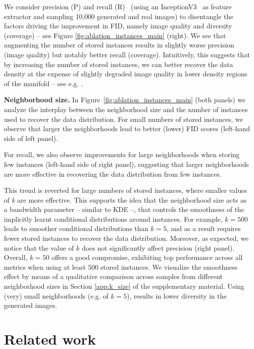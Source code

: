 We consider precision (P) and recall (R)~\cite{kynkaanniemi2019improved} (using an InceptionV3~\cite{DBLP:journals/corr/SzegedyVISW15} as feature extractor and sampling 10,000 generated and real images) to disentangle the factors driving the improvement in FID, namely image quality and diversity (coverage) -- see Figure \ref{fig:ablation_instances_main} (right). We see that augmenting the number of stored instances results in slightly worse precision (image quality) but notably better recall (coverage). Intuitively, this suggests that by increasing the number of stored instances, we can better recover the data density at the expense of slightly degraded image quality in lower density regions of the manifold -- see e.g. \cite{devries2020instance}.

\textbf{Neighborhood size.} In Figure~\ref{fig:ablation_instances_main} (both panels) we analyze the interplay between the neighborhood size and the number of instances used to recover the data distribution. For small numbers of stored instances, we observe that  larger the neighborhoods lead to better (lower)  FID scores (left-hand side of left panel).  

For recall, we also observe improvements for large neighborhoods when storing few instances  (left-hand side of right panel), suggesting that larger neighborhoods are more effective in recovering the data distribution from few instances. 

This trend is reverted for large numbers of stored instances, where smaller values of \emph{k} are more effective. This supports the idea that the neighborhood size acts as a bandwidth parameter -- similar to KDE --, that controls the smoothness of the implicitly learnt conditional distributions around instances. For example, $k=500$ leads to smoother conditional distributions than $k=5$, and as a result requires fewer stored instances to recover the data distribution. Moreover, as expected, we notice that the value of $k$ does not significantly affect precision (right panel).  Overall, $k=50$ offers a good compromise, exhibiting top performance across all metrics when using at least $500$ stored instances. We visualize the smoothness effect by means of a qualitative comparison across samples from different neighborhood sizes in Section \ref{app:k_size} of the supplementary material. Using (very) small neighborhoods (e.g. of $k=5$), results in lower diversity in the generated images.  

\section{Related work}


